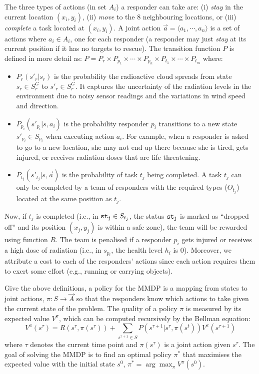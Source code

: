 The three types of actions  (in set $A_i$) a responder can take
are: (i) {\em stay} in the current location $(x_i, y_i)$, (ii) {\em
move} to the 8 neighbouring locations, or (iii) {\em complete} a
task located at $(x_i, y_i)$. A joint action $\vec{a}=\langle a_1,
\cdots, a_n \rangle$ is a set of actions where $a_i\in A_i$, one
for each responder (a responder may just \emph{stay} at its current
position if it has no targets to rescue). The transition function
$P$ is defined in more detail as: $P= P_r \times P_{p_1} \times
\cdots \times P_{p_n} \times P_{t_1} \times \cdots \times P_{t_m}$
where:
\begin{itemize}
    \itemsep=-2pt
    \item $P_r(s'_r|s_r)$ is the probability the radioactive
        cloud spreads from state $s_r\in S^G_r$ to $s'_r\in
        S^G_r$. It captures the uncertainty of the  radiation
        levels in the environment due to  noisy sensor readings
        and the variations in wind speed and direction.
    \item $P_{p_i}(s'_{p_i}|s, a_i)$ is the probability
        responder $p_i$ transitions to a new state $s'_{p_i}\in
        S_{p_i}$ when executing action $a_i$. For example, when
        a responder is asked to go to a new location,  she
        may not end up there because  she is tired,
        gets injured, or receives radiation doses that are life
        threatening.
    \item $P_{t_j}(s'_{t_j}|s, \vec{a})$ is the probability
        of task $t_j$ being completed. A task $t_j$ can only be completed by a
        team of responders with the required types ($\Theta_{t_j}$) located at the
        same position as $t_j$.
\end{itemize}

Now,  if  $t_j$ is completed (i.e., in ${\tt st_j}\in S_{t_j}$, the
status ${\tt st_j}$ is marked as ``dropped off'' and its position $(x_j,
y_j)$ is within a safe zone), the team will be rewarded using
function $R$. The team is penalised if a responder $p_i$ gets
injured or receives a high dose of radiation (i.e., in $s_{p_i}$,
the health level $h_i$ is 0). Moreover, we attribute a cost to each
of the responders' actions since  each  action requires them to
exert some effort (e.g., running or carrying objects).


Give the above definitions, a policy for the MMDP is a mapping from
states to joint actions, $\pi: S \rightarrow \vec{A}$ so that the
responders know which actions to take given the current state of
the problem. The quality of a policy $\pi$ is  measured by
its expected value $V^\pi$, which can be computed recursively by
the Bellman equation:
\begin{equation}
  V^\pi(s^\tau) = R(s^\tau, \pi(s^\tau)) + \!\!\!\sum_{s^{\tau+1}\in S}\!\!\!
  P(s^{\tau+1}|s^\tau, \pi(s^t)) V^\pi(s^{\tau+1})
\end{equation}
where $\tau$ denotes the current time point and $\pi(s^\tau)$ is a joint action given $s^\tau$. The goal of solving
the MMDP is to find an optimal policy $\pi^*$ that maximises the
expected value with the initial state $s^0$, $\pi^* =
\arg\max_{\pi} V^\pi(s^0)$.


